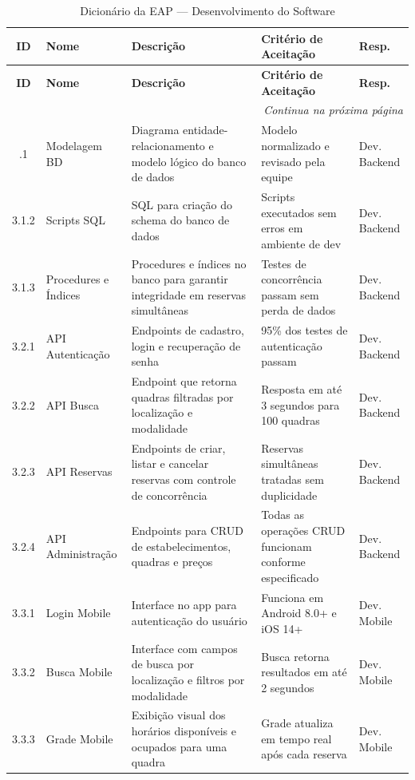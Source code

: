 \documentclass[12pt,a4paper,oneside]{report}
\begin{document}
\begin{longtable}{c p{2.2cm} p{3.2cm} p{3.5cm} p{2.2cm}}
\caption{Dicionário da EAP --- Desenvolvimento do Software} \\
\toprule
\textbf{ID} & \textbf{Nome} & \textbf{Descrição} & \textbf{Critério de Aceitação} & \textbf{Resp.} \\
\midrule
\endfirsthead
\toprule
\textbf{ID} & \textbf{Nome} & \textbf{Descrição} & \textbf{Critério de Aceitação} & \textbf{Resp.} \\
\midrule
\endhead
\midrule
\multicolumn{5}{r}{\textit{Continua na próxima página}} \\
\endfoot
\bottomrule
\endlastfoot
3.1.1 & Modelagem BD & Diagrama entidade-relacionamento e modelo lógico do banco de dados & Modelo normalizado e revisado pela equipe & Dev. Backend \\
3.1.2 & Scripts SQL & SQL para criação do schema do banco de dados & Scripts executados sem erros em ambiente de dev & Dev. Backend \\
3.1.3 & Procedures e Índices & Procedures e índices no banco para garantir integridade em reservas simultâneas & Testes de concorrência passam sem perda de dados & Dev. Backend \\
3.2.1 & API Autenticação & Endpoints de cadastro, login e recuperação de senha & 95\% dos testes de autenticação passam & Dev. Backend \\
3.2.2 & API Busca & Endpoint que retorna quadras filtradas por localização e modalidade & Resposta em até 3 segundos para 100 quadras & Dev. Backend \\
3.2.3 & API Reservas & Endpoints de criar, listar e cancelar reservas com controle de concorrência & Reservas simultâneas tratadas sem duplicidade & Dev. Backend \\
3.2.4 & API Administração & Endpoints para CRUD de estabelecimentos, quadras e preços & Todas as operações CRUD funcionam conforme especificado & Dev. Backend \\
3.3.1 & Login Mobile & Interface no app para autenticação do usuário & Funciona em Android 8.0+ e iOS 14+ & Dev. Mobile \\
3.3.2 & Busca Mobile & Interface com campos de busca por localização e filtros por modalidade & Busca retorna resultados em até 2 segundos & Dev. Mobile \\
3.3.3 & Grade Mobile & Exibição visual dos horários disponíveis e ocupados para uma quadra & Grade atualiza em tempo real após cada reserva & Dev. Mobile \\

\end{longtable}
\end{document}
